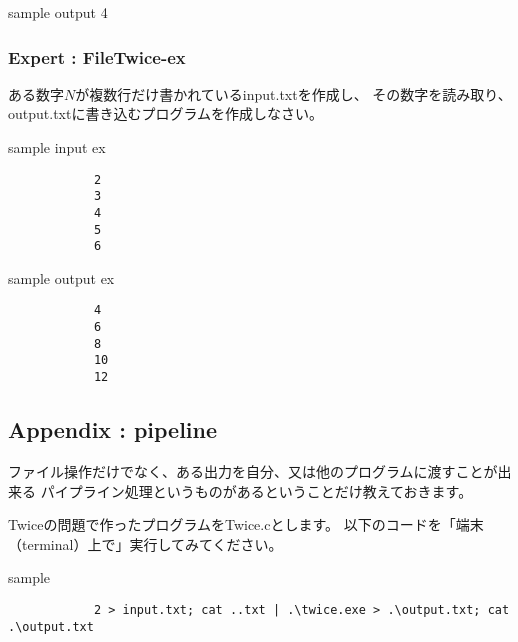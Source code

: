		\begin{itembox}{sample output}
			4
		\end{itembox}
		
	\subsubsection{Expert : FileTwice-ex}
		ある数字$N$が複数行だけ書かれているinput.txtを作成し、
		その数字を読み取り、output.txtに書き込むプログラムを作成しなさい。
		
		\begin{itembox}{sample input ex}
			\begin{verbatim}
			2
			3
			4
			5
			6
			\end{verbatim}
		\end{itembox}
		
		\begin{itembox}{sample output ex}
			\begin{verbatim}
			4
			6
			8
			10
			12
			\end{verbatim}
		\end{itembox}
	
	\subsection{Appendix : pipeline}
		ファイル操作だけでなく、ある出力を自分、又は他のプログラムに渡すことが出来る
		パイプライン処理というものがあるということだけ教えておきます。
		
		Twiceの問題で作ったプログラムをTwice.cとします。
		以下のコードを「端末（terminal）上で」実行してみてください。
		
		\begin{itembox}{sample}
			\begin{verbatim}
			2 > input.txt; cat ..txt | .\twice.exe > .\output.txt; cat .\output.txt
			\end{verbatim}
		\end{itembox}
		
		
